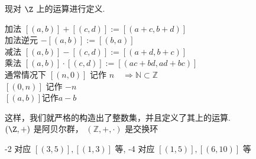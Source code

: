 现对 $\Z$ 上的运算进行定义.\\
\begin{definition}
	加法 $[(a, b)]+[(c, d)]:=[(a+c, b+d)]$\\
	加法逆元 $-[(a, b)]:=[(b, a)]$\\
	减法 $[(a, b)]-[(c, d)]:=[(a+d, b+c)]$\\
	乘法 $[(a, b)] \cdot[(c, d)]:=[(a c+b d, a d+b c)]$\\
	通常情况下 $[(n, 0)]$ 记作 $n \quad \Rightarrow \mathbb{N} \subset \mathbb{Z}$\\
	$[(0, n)]$ 记作 $-n$\\
	$[(a,b)]$记作$a-b$\\
\end{definition}

这样，我们就严格的构造出了整数集，并且定义了其上的运算.\\
$(\Z,+)$ 是阿贝尔群，
$(\mathbb{Z}, +, \cdot)$ 是交换环\\
\begin{example}
	-2 对应 $[(3,5)],[(1,3)]$ 等,
	-4 对应 $[(1,5)],[(6,10)]$ 等
\end{example}



